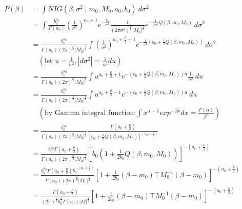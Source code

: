 \documentclass[
]{book}
\theoremstyle{definition}
\theoremstyle{definition}
\theoremstyle{definition}
\theoremstyle{definition}
\theoremstyle{remark}
\begin{document}
\begin{align}
P(\beta ) &=\int NIG \left(\beta, \sigma^{2} \mid m_{0}, M_{0}, a_{0}, b_{0}\right) \  d\sigma^{2} \\
&= \int \frac{b_0^{a_0}}{\Gamma\left(a_{0}\right)}
\left(\frac{1}{\sigma^{2}}\right)^{a_{0}+1} e^{-\frac{b_{0}}{\sigma^{2}}} \frac{1}{(2 \pi \sigma^{2})^{\frac{p}{2}}\left| M_{0}\right|^{\frac{1}{2}}} e^{-\frac{1}{2 \sigma^{2}} Q \left(\beta, m_{0}, M_{0}\right)} \  d\sigma^{2} \\
&= \frac{b_0^{a_0}}{\Gamma\left(a_{0}\right)(2 \pi)^{\frac{p}{2}}\left| M_{0}\right|^{\frac{1}{2}}}
\int 
\left(\frac{1}{\sigma^{2}}\right)^{a_{0}+\frac{p}{2}+1} e^{-\frac{1}{\sigma^{2}}(b_{0}+\frac{1}{2} Q \left(\beta, m_{0}, M_{0}\right))} \  d\sigma^{2} \\
& \quad (\text{let } u = \frac{1}{\sigma^2}, \left|d\sigma^{2}\right|=\frac{1}{u^2} d u) \\
&= \frac{b_0^{a_0}}{\Gamma\left(a_{0}\right)(2 \pi)^{\frac{p}{2}}\left| M_{0}\right|^{\frac{1}{2}}}
\int 
u^{a_{0}+\frac{p}{2}+1} e^{-(b_{0}+\frac{1}{2} Q \left(\beta, m_{0}, M_{0}\right)) u } \frac{1}{u^2} \  du \\
&= \frac{b_0^{a_0}}{\Gamma\left(a_{0}\right)(2 \pi)^{\frac{p}{2}}\left| M_{0}\right|^{\frac{1}{2}}}
\int 
u^{a_{0}+\frac{p}{2}-1} e^{-(b_{0}+\frac{1}{2} Q \left(\beta, m_{0}, M_{0}\right)) u} \  du \\
& \quad (\text{by Gamma integral function:} \int x^{\alpha - 1} exp^{-\beta x} dx = \frac{\Gamma(\alpha)}{\beta^{\alpha}}) \\
&= \frac{b_{0}^{a_{0}} }{\Gamma\left(a_{0}\right)(2 \pi)^\frac{p}{2}\left|M_{0}\right|^{\frac{1}{2}}} \frac{\Gamma\left(a_{0}+\frac{p}{2}\right)}{\left[b_{0}+\frac{1}{2} Q(\beta,m_0,M_0)\right]^{\left(a_{0}+\frac{p}{2}\right)}} \\
& = \frac{b_0^{a_0}\Gamma\left(a_{0}+\frac{p}{2}\right)}{\Gamma\left(a_{0}\right)(2 \pi)^ \frac{p}{2}\left|M_{0}\right|^{\frac{1}{2}}} 
\left[b_0(1+\frac{1}{2 b_0} Q(\beta,m_0,M_0))\right]^{-\left(a_{0}+\frac{p}{2}\right)} \\
& = \frac{b_0^{a_0}\Gamma\left(a_{0}+\frac{p}{2}\right) b_0^{- \left( a_0+\frac{p}{2}\right)}}{\Gamma\left(a_{0}\right)(2 \pi)^ \frac{p}{2}\left|M_{0}\right|^{\frac{1}{2}}} 
\left[1+\frac{1}{2 b_0} \left(\beta-m_{0}\right){\top} M_{0}^{-1}\left(\beta-m_{0}\right) \right]^{-\left(a_{0}+\frac{p}{2}\right)} \\
& =\frac{\Gamma\left(a_{0}+\frac{p}{2}\right)}{\left(2 \pi \right)^{\frac{p}{2}} b_{0}^{\frac{p}{2}} \Gamma\left(a_{0}\right)|M|^{\frac{1}{2}}}\left[1+\frac{1}{2 b_{0}} \left(\beta-m_{0}\right){\top} M_{0}^{-1}\left(\beta-m_{0}\right) \right]^{-\left(a_{0}+\frac{p}{2}\right)} \\

\end{align}
\end{document}
